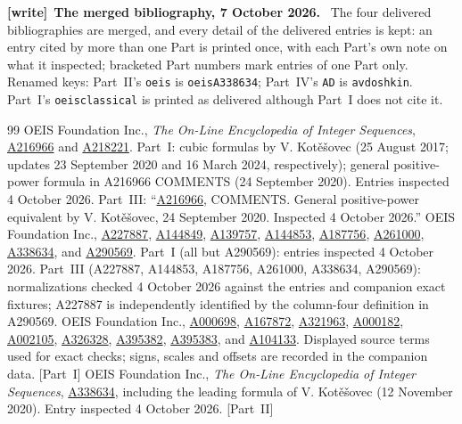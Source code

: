 \documentclass[11pt,letterpaper]{article}
\numberwithin{equation}{section}
\theoremstyle{remark}\newtheorem{remark}[theorem]{Remark}
\newcommand{\file}[1]{\nolinkurl{#1}}
\newenvironment{writenote}[1][]{\par\smallskip\begingroup\small
 \noindent\textbf{[write]}\if\relax\detokenize{#1}\relax\else~\textbf{#1.}\fi\ }%
 {\par\endgroup\smallskip}
\begin{document}
\begin{writenote}[The merged bibliography, 7 October 2026]
The four delivered bibliographies are merged, and every detail of the
delivered entries is kept: an entry cited by more than one Part is printed
once, with each Part's own note on what it inspected; bracketed Part numbers
mark entries of one Part only. Renamed keys: Part~II's \file{oeis} is
\file{oeisA338634}; Part~IV's \file{AD} is \file{avdoshkin}. Part~I's
\file{oeisclassical} is printed as delivered although Part~I does not cite it.
\end{writenote}
\clearpage
\begingroup\small\raggedright
\begin{thebibliography}{99}
 OEIS Foundation Inc., \emph{The On-Line Encyclopedia of Integer Sequences}, \href{https://oeis.org/A216966}{A216966} and \href{https://oeis.org/A218221}{A218221}. Part~I: cubic formulas by V. Kot\v e\v sovec (25 August 2017; updates 23 September 2020 and 16 March 2024, respectively); general positive-power formula in A216966 COMMENTS (24 September 2020). Entries inspected 4 October 2026. Part~III: ``\href{https://oeis.org/A216966}{A216966}, COMMENTS. General positive-power equivalent by V. Kot\v e\v sovec, 24 September 2020. Inspected 4 October 2026.''
 OEIS Foundation Inc., \href{https://oeis.org/A227887}{A227887}, \href{https://oeis.org/A144849}{A144849}, \href{https://oeis.org/A139757}{A139757}, \href{https://oeis.org/A144853}{A144853}, \href{https://oeis.org/A187756}{A187756}, \href{https://oeis.org/A261000}{A261000}, \href{https://oeis.org/A338634}{A338634}, and \href{https://oeis.org/A290569}{A290569}. Part~I (all but A290569): entries inspected 4 October 2026. Part~III (A227887, A144853, A187756, A261000, A338634, A290569): normalizations checked 4 October 2026 against the entries and companion exact fixtures; A227887 is independently identified by the column-four definition in A290569.
 OEIS Foundation Inc., \href{https://oeis.org/A000698}{A000698}, \href{https://oeis.org/A167872}{A167872}, \href{https://oeis.org/A321963}{A321963}, \href{https://oeis.org/A000182}{A000182}, \href{https://oeis.org/A002105}{A002105}, \href{https://oeis.org/A326328}{A326328}, \href{https://oeis.org/A395382}{A395382}, \href{https://oeis.org/A395383}{A395383}, and \href{https://oeis.org/A104133}{A104133}. Displayed source terms used for exact checks; signs, scales and offsets are recorded in the companion data. [Part~I]
 OEIS Foundation Inc., \emph{The On-Line Encyclopedia of Integer Sequences}, \href{https://oeis.org/A338634}{A338634}, including the leading formula of V. Kot\v e\v sovec (12 November 2020). Entry inspected 4 October 2026. [Part~II]

\end{thebibliography}
\end{document}
